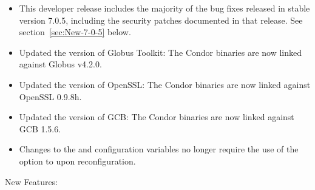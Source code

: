 \begin{itemize}

\item This developer release includes the majority of the bug fixes released
	in stable version 7.0.5, including the security patches documented in that
	release.  See section~\ref{sec:New-7-0-5} below.

\item Updated the version of Globus Toolkit: The Condor binaries are now
	linked against Globus v4.2.0.

\item Updated the version of OpenSSL: The Condor binaries are now linked
	against OpenSSL 0.9.8h.

\item Updated the version of GCB: The Condor binaries are now linked
	against GCB 1.5.6.

\item Changes to the  and  configuration
	variables no longer require the use of the  option to
	 upon reconfiguration.

\end{itemize}

\noindent New Features:

